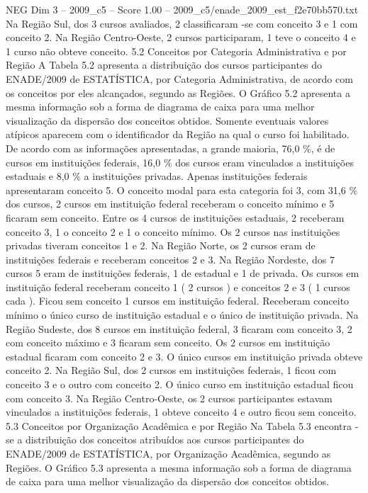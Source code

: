 \begin{textsample}{NEG Dim 3 – 2009\_c5 – Score 1.00 – 2009\_c5/enade\_2009\_est\_f2e70bb570.txt}
Na Região Sul, dos 3 cursos avaliados, 2 classificaram -se com conceito 3 e 1 com conceito 2.
Na Região Centro-Oeste, 2 cursos participaram, 1 teve o conceito 4 e 1 curso não obteve conceito. 5.2 Conceitos por Categoria Administrativa e por Região A Tabela 5.2 apresenta a distribuição dos cursos participantes do ENADE/2009 de ESTATÍSTICA, por Categoria Administrativa, de acordo com os conceitos por eles alcançados, segundo as Regiões.
O Gráfico 5.2 apresenta a mesma informação sob a forma de diagrama de caixa para uma melhor visualização da dispersão dos conceitos obtidos.
Somente eventuais valores atípicos aparecem com o identificador da Região na qual o curso foi habilitado.
De acordo com as informações apresentadas, a grande maioria, 76,0 \%, é de cursos em instituições federais, 16,0 \% dos cursos eram vinculados a instituições estaduais e 8,0 \% a instituições privadas.
Apenas instituições federais apresentaram conceito 5.
O conceito modal para esta categoria foi 3, com 31,6 \% dos cursos, 2 cursos em instituição federal receberam o conceito mínimo e 5 ficaram sem conceito.
Entre os 4 cursos de instituições estaduais, 2 receberam conceito 3, 1 o conceito 2 e 1 o conceito mínimo.
Os 2 cursos nas instituições privadas tiveram conceitos 1 e 2.
Na Região Norte, os 2 cursos eram de instituições federais e receberam conceitos 2 e 3.
Na Região Nordeste, dos 7 cursos 5 eram de instituições federais, 1 de estadual e 1 de privada.
Os cursos em instituição federal receberam conceito 1 ( 2 cursos ) e conceitos 2 e 3 ( 1 cursos cada ).
Ficou sem conceito 1 cursos em instituição federal.
Receberam conceito mínimo o único curso de instituição estadual e o único de instituição privada.
Na Região Sudeste, dos 8 cursos em instituição federal, 3 ficaram com conceito 3, 2 com conceito máximo e 3 ficaram sem conceito.
Os 2 cursos em instituição estadual ficaram com conceito 2 e 3.
O único cursos em instituição privada obteve conceito 2.
Na Região Sul, dos 2 cursos em instituições federais, 1 ficou com conceito 3 e o outro com conceito 2.
O único curso em instituição estadual ficou com conceito 3.
Na Região Centro-Oeste, os 2 cursos participantes estavam vinculados a instituições federais, 1 obteve conceito 4 e outro ficou sem conceito. 5.3 Conceitos por Organização Acadêmica e por Região Na Tabela 5.3 encontra -se a distribuição dos conceitos atribuídos aos cursos participantes do ENADE/2009 de ESTATÍSTICA, por Organização Acadêmica, segundo as Regiões.
O Gráfico 5.3 apresenta a mesma informação sob a forma de diagrama de caixa para uma melhor visualização da dispersão dos conceitos obtidos.

\end{textsample}
